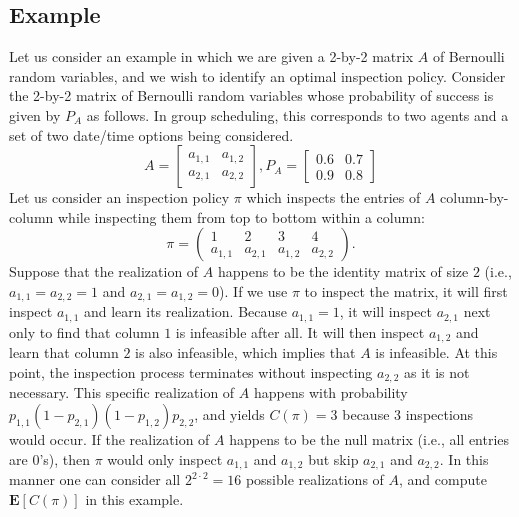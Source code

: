  \subsection{Example} \label{matrix:sec:example}
Let us consider an example in which we are given a 2-by-2 matrix $A$ of Bernoulli random variables, and we wish to identify an optimal inspection policy. Consider the 2-by-2 matrix of Bernoulli random variables whose probability of success is given by $P_A$ as follows. In group scheduling, this corresponds to two agents and a set of two date/time options being considered.
 \begin{equation*}
 A = 
 	\begin{bmatrix}
 		a_{1,1}  & a_{1, 2} \\
 		a_{2,1}  & a_{2, 2}
 	\end{bmatrix},
 P_A = 
 	\begin{bmatrix}
 		0.6  & 0.7  \\
 		0.9  & 0.8 
 	\end{bmatrix}
 \end{equation*}
 Let us consider an inspection policy $\pi$ which inspects the entries of $A$ column-by-column while inspecting them from top to bottom within a column:
 \begin{equation*}
 	\pi = 
 	\begin{pmatrix} 
 	1 & 2 & 3 & 4  \\
 	a_{1,1} & a_{2,1} & a_{1,2} & a_{2,2} 
 	\end{pmatrix}.
 \end{equation*}	
 Suppose that the realization of $A$ happens to be the identity matrix of size $2$ (i.e., $a_{1,1} = a_{2,2} = 1$ and $a_{2,1} = a_{1,2} = 0$). If we use $\pi$ to inspect the matrix, it will first inspect $a_{1,1}$ and learn its realization. Because $a_{1,1} = 1$, it will inspect $a_{2,1}$ next only to find that column $1$ is infeasible after all. It will then inspect $a_{1,2}$ and learn that column $2$ is also infeasible, which implies that $A$ is infeasible. At this point, the inspection process terminates without inspecting $a_{2,2}$ as it is not necessary.
 This specific realization of $A$ happens with probability $p_{1,1}(1 - p_{2,1})(1-p_{1,2})p_{2,2}$, and yields $C(\pi) = 3$ because 3 inspections would occur. 
 If the realization of $A$ happens to be the null matrix (i.e., all entries are $0$'s), then $\pi$ would only inspect $a_{1,1}$ and $a_{1,2}$ but skip $a_{2,1}$ and $a_{2,2}$.  In this manner one can consider all $2^{2\cdot 2} = 16$ possible realizations of $A$, and compute $\mathbf{E}[C(\pi)]$ in this example. 

